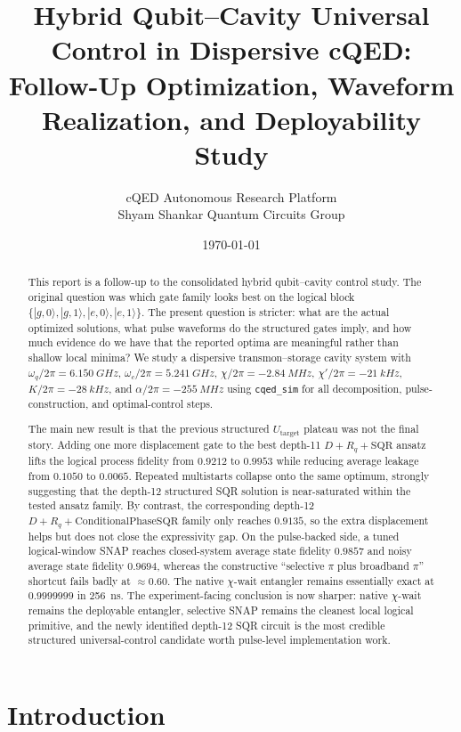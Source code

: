 \documentclass[11pt, a4paper]{article}
\title{\textbf{Hybrid Qubit--Cavity Universal Control in Dispersive cQED:\\
Follow-Up Optimization, Waveform Realization, and Deployability Study}}
\author{cQED Autonomous Research Platform \\ Shyam Shankar Quantum Circuits Group}
\date{\today}
\begin{document}
\maketitle

\begin{abstract}
This report is a follow-up to the consolidated hybrid qubit--cavity control study. The original question was which gate family looks best on the logical block $\{|g,0\rangle, |g,1\rangle, |e,0\rangle, |e,1\rangle\}$. The present question is stricter: what are the actual optimized solutions, what pulse waveforms do the structured gates imply, and how much evidence do we have that the reported optima are meaningful rather than shallow local minima? We study a dispersive transmon--storage cavity system with $\omega_q/2\pi=\SI{6.150}{GHz}$, $\omega_c/2\pi=\SI{5.241}{GHz}$, $\chi/2\pi=\SI{-2.84}{MHz}$, $\chi'/2\pi=\SI{-21}{kHz}$, $K/2\pi=\SI{-28}{kHz}$, and $\alpha/2\pi=\SI{-255}{MHz}$ using \texttt{cqed\_sim} for all decomposition, pulse-construction, and optimal-control steps.

The main new result is that the previous structured $U_{\mathrm{target}}$ plateau was not the final story. Adding one more displacement gate to the best depth-11 $D+R_q+\mathrm{SQR}$ ansatz lifts the logical process fidelity from $0.9212$ to $0.9953$ while reducing average leakage from $0.1050$ to $0.0065$. Repeated multistarts collapse onto the same optimum, strongly suggesting that the depth-12 structured SQR solution is near-saturated within the tested ansatz family. By contrast, the corresponding depth-12 $D+R_q+\mathrm{ConditionalPhaseSQR}$ family only reaches $0.9135$, so the extra displacement helps but does not close the expressivity gap. On the pulse-backed side, a tuned logical-window SNAP reaches closed-system average state fidelity $0.9857$ and noisy average state fidelity $0.9694$, whereas the constructive ``selective $\pi$ plus broadband $\pi$'' shortcut fails badly at $\approx 0.60$. The native $\chi$-wait entangler remains essentially exact at $0.9999999$ in \SI{256}{ns}. The experiment-facing conclusion is now sharper: native $\chi$-wait remains the deployable entangler, selective SNAP remains the cleanest local logical primitive, and the newly identified depth-12 SQR circuit is the most credible structured universal-control candidate worth pulse-level implementation work.
\end{abstract}

\section{Introduction}
\end{document}

